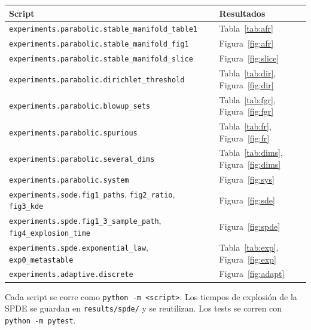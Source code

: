 \documentclass[11pt,a4paper]{article}
\newcommand{\code}[1]{\texttt{#1}}
\begin{document}
\begin{center}
\small
\begin{tabular}{ll}
\toprule
Script & Resultados\\
\midrule
\code{experiments.parabolic.stable\_manifold\_table1} & Tabla~\ref{tab:afr}\\
\code{experiments.parabolic.stable\_manifold\_fig1} & Figura~\ref{fig:afr}\\
\code{experiments.parabolic.stable\_manifold\_slice} & Figura~\ref{fig:slice}\\
\code{experiments.parabolic.dirichlet\_threshold} & Tabla~\ref{tab:dir}, Figura~\ref{fig:dir}\\
\code{experiments.parabolic.blowup\_sets} & Tabla~\ref{tab:fgr}, Figura~\ref{fig:fgr}\\
\code{experiments.parabolic.spurious} & Tabla~\ref{tab:fr}, Figura~\ref{fig:fr}\\
\code{experiments.parabolic.several\_dims} & Tabla~\ref{tab:dims}, Figura~\ref{fig:dims}\\
\code{experiments.parabolic.system} & Figura~\ref{fig:sys}\\
\code{experiments.sode.fig1\_paths}, \code{fig2\_ratio}, \code{fig3\_kde} & Figura~\ref{fig:sde}\\
\code{experiments.spde.fig1\_3\_sample\_path}, \code{fig4\_explosion\_time} & Figura~\ref{fig:spde}\\
\code{experiments.spde.exponential\_law}, \code{exp0\_metastable} & Tabla~\ref{tab:exp}, Figura~\ref{fig:exp}\\
\code{experiments.adaptive.discrete} & Figura~\ref{fig:adapt}\\
\bottomrule
\end{tabular}
\end{center}
Cada script se corre como \code{python -m <script>}. Los tiempos de
explosión de la SPDE se guardan en \code{results/spde/} y se reutilizan. Los
tests se corren con \code{python -m pytest}.
\end{document}
